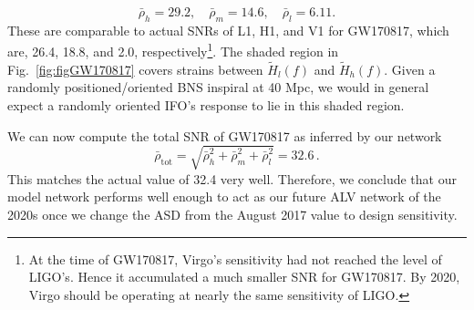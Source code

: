 \documentclass[prd,amsmath,amssymb,aps,floats,amsfonts,notitlepage,superscriptaddress,eqsecnum,nofootinbib,10pt]{revtex4-1}
\newcommand{\be}{\begin{equation}}
\newcommand{\ee}{\end{equation}}
\begin{document}
%
\be
\bar\rho_h = 29.2,\quad \bar\rho_m = 14.6,\quad \bar\rho_l = 6.11 \label{eq:GW170817_SNRs}.
\ee
%
These are comparable to actual SNRs of L1, H1, and V1 for GW170817, which are, 26.4, 18.8, and 2.0, respectively\footnote{At the time of GW170817, Virgo's sensitivity had not reached the level of LIGO's. Hence it accumulated a much smaller SNR for GW170817. By 2020, Virgo should be operating at nearly the same sensitivity of LIGO.}.
The shaded region in Fig.~\ref{fig:figGW170817} covers strains between $\tilde{H}_l(f)$ and $\tilde{H}_h(f)$. %
Given a randomly positioned/oriented BNS inspiral at 40 Mpc, we would in general expect a randomly oriented IFO's response to lie in this shaded region.
%

%
%

We can now compute the total SNR of GW170817 as inferred by our network
%
\be
\bar\rho_\text{tot}= \sqrt{\bar\rho^2_h+\bar\rho^2_m+\bar\rho^2_l}= 32.6 \, \label{eq:SNR_total_GW170817} .
\ee
%
This matches the actual value of 32.4 very well. Therefore, we conclude that our model network performs well enough to 
act as our future ALV network of the 2020s once we change
the ASD from the August 2017 value to design sensitivity.
%
%
%
%
%
\end{document}
